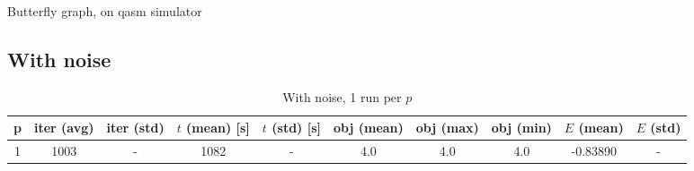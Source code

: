 \documentclass{beamer}
\begin{document}
\begin{frame}{Butterfly graph, on qasm simulator}
\subsection{With noise}
\begin{table}
	\begin{center}
		\begin{adjustbox}{width=\textwidth}
			\begin{tabular}{||c c c c c c c c c c||} 
				\hline
				p & iter (avg) & iter (std) & $t$ (mean) [s] & $t$ (std) [s] & obj (mean) & obj (max) & obj (min) & $E$ (mean) & $E$ (std) \\ [0.5ex] 
				\hline\hline
				1 & 1003 & - & 1082 & - & 4.0 & 4.0 & 4.0 & -0.83890 & -\\ 
				 [1ex] 
				\hline
			\end{tabular}
		\end{adjustbox}
	\end{center}
	\caption{With noise, 1 run per $p$}
\end{table}
\end{frame}
\end{document}
